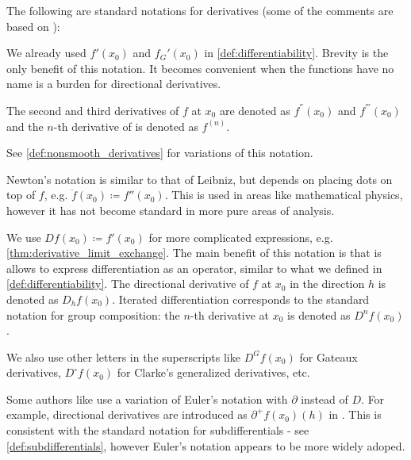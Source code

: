 \begin{remark}\label{rem:derivative_notation}
  The following are standard notations for derivatives (some of the comments are based on \cite[146]{Фихтенгольц1968ОсновыАнализаТом2}):
  \begin{thmenum}
     We already used  \( f'(x_0) \) and \( f_G'(x_0) \) in \cref{def:differentiability}. Brevity is the only benefit of this notation. It becomes convenient when the functions have no name is a burden for directional derivatives.

    The second and third derivatives of \( f \) at \( x_0 \) are denoted as \( f^{''}(x_0) \) and \( f^{'''}(x_0) \) and the \( n \)-th derivative of is denoted as \( f^{(n)} \).

    See \cref{def:nonsmooth_derivatives} for variations of this notation.

     Newton's notation is similar to that of Leibniz, but depends on placing dots on top of \( f \), e.g. \( \ddot{f}(x_0) \coloneqq f''(x_0) \). This is used in areas like mathematical physics, however it has not become standard in more pure areas of analysis.

     We use  \( Df(x_0) \coloneqq f'(x_0) \) for more complicated expressions, e.g. \cref{thm:derivative_limit_exchange}. The main benefit of this notation is that is allows to express differentiation as an operator, similar to what we defined in \cref{def:differentiability}. The directional derivative of \( f \) at \( x_0 \) in the direction \( h \) is denoted as \( D_h f(x_0) \). Iterated differentiation corresponds to the standard notation for group composition: the \( n \)-th derivative at \( x_0 \) is denoted as \( D^n f(x_0) \).

    We also use other letters in the superscripts like \( D^G f(x_0) \) for Gateaux derivatives, \( D^\circ f(x_0) \) for Clarke's generalized derivatives, etc.

     Some authors like \cite{Phelps1993ConvexDifferentiability} use a variation of Euler's notation with \( \partial \) instead of \( D \). For example, directional derivatives are introduced as \( \partial^+ f(x_0)(h) \) in \cite[lemma 1.2]{Phelps1993ConvexDifferentiability}. This is consistent with the standard notation for subdifferentials - see \cref{def:subdifferentials}, however Euler's notation appears to be more widely adoped.


\end{thmenum}
\end{remark}
